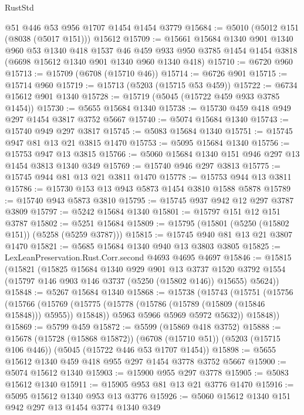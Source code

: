 \begin{lexlean}{RustStd}
\begin{coremodule}
    @51
    @446
    @53
    @956
    @1707
    @1454
    @1454
    @3779
@15684 := @5010 (@5012 @151 (@8038 (@5017 @151))) @15612
@15709 := @15661
    @15684
    @1340
    @901
    @1340
    @960
    @53
    @1340
    @418
    @1537
    @46
    @459
    @933
    @950
    @3785
    @1454
    @1454
    @3818
    (@6698 @15612 @1340 @901 @1340 @960 @1340 @418)
@15710 := @6720 @960
@15713 := @15709 (@6708 (@15710 @46))
@15714 := @6726 @901
@15715 := @15714 @960
@15719 := @15713 (@5203 (@15715 @53 @459))
@15722 := @6734 @15612 @901 @1340
@15728 := @15719 (@5045 (@15722 @459 @933 @3785 @1454))
@15730 := @5655 @15684 @1340
@15738 := @15730 @459 @418 @949 @297 @1454 @3817 @3752 @5667
@15740 := @5074 @15684 @1340
@15743 := @15740 @949 @297 @3817
@15745 := @5083 @15684 @1340
@15751 := @15745 @947 @81 @13 @21 @3815 @1470
@15753 := @5095 @15684 @1340
@15756 := @15753 @947 @13 @3815
@15766 := @5060 @15684 @1340 @151 @946 @297 @13 @1454 @3813 @1340 @349
@15769 := @15740 @946 @297 @3813
@15775 := @15745 @944 @81 @13 @21 @3811 @1470
@15778 := @15753 @944 @13 @3811
@15786 := @15730 @153 @13 @943 @5873 @1454 @3810 @1588 @5878
@15789 := @15740 @943 @5873 @3810
@15795 := @15745 @937 @942 @12 @297 @3787 @3809
@15797 := @5242 @15684 @1340
@15801 := @15797 @151 @12 @151 @3787
@15802 := @5251 @15684
@15809 := @15795 (@15801 (@5250 (@15802 @151)) (@5258 (@5259 @3787)))
@15815 := @15745 @940 @81 @13 @21 @3807 @1470
@15821 := @5685 @15684 @1340 @940 @13 @3803 @3805
@15825 := LexLeanPreservation.Rust.Corr.second @4693 @4695 @4697
@15846 := @15815
    (@15821
      (@15825
        @15684
        @1340
        @929
        @901
        @13
        @3737
        @1520
        @3792
        @1554
        (@15797 @146 @903 @146 @3737 (@5250 (@15802 @146)) @15655)
        @5624))
@15848 := @5267 @15684 @1340
@15868 := @15738
    (@15743
      (@15751
        (@15756
          (@15766
            (@15769 (@15775 (@15778 (@15786 (@15789 (@15809 (@15846 @15848))) @5955)) @15848))
            @5963
            @5966
            @5969
            @5972
            @5632))
        @15848))
@15869 := @5799 @459
@15872 := @5599 (@15869 @418 @3752)
@15888 := @15678
    (@15728 (@15868 @15872))
    (@6708 (@15710 @51))
    (@5203 (@15715 @106 @446))
    (@5045 (@15722 @446 @53 @1707 @1454))
@15898 := @5655 @15612 @1340 @459 @418 @955 @297 @1454 @3778 @3752 @5667
@15900 := @5074 @15612 @1340
@15903 := @15900 @955 @297 @3778
@15905 := @5083 @15612 @1340
@15911 := @15905 @953 @81 @13 @21 @3776 @1470
@15916 := @5095 @15612 @1340 @953 @13 @3776
@15926 := @5060 @15612 @1340 @151 @942 @297 @13 @1454 @3774 @1340 @349

\end{coremodule}
\end{lexlean}
